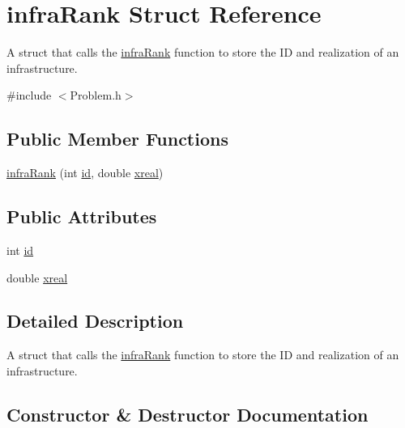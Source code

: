 \hypertarget{structinfraRank}{}\section{infra\+Rank Struct Reference}
\label{structinfraRank}


A struct that calls the \mbox{\hyperlink{structinfraRank}{infra\+Rank}} function to store the ID and realization of an infrastructure.  




{\ttfamily \#include $<$Problem.\+h$>$}

\subsection*{Public Member Functions}
\begin{DoxyCompactItemize}
\item 
\mbox{\hyperlink{structinfraRank_aa50dcfdcee689bd1484c9ac2b09bc694}{infra\+Rank}} (int \mbox{\hyperlink{structinfraRank_ace3640f7fdc691b68111cf07e0eabaae}{id}}, double \mbox{\hyperlink{structinfraRank_a1bb966369809456d65bd4e2d4e19d775}{xreal}})
\end{DoxyCompactItemize}
\subsection*{Public Attributes}
\begin{DoxyCompactItemize}
\item 
int \mbox{\hyperlink{structinfraRank_ace3640f7fdc691b68111cf07e0eabaae}{id}}
\item 
double \mbox{\hyperlink{structinfraRank_a1bb966369809456d65bd4e2d4e19d775}{xreal}}
\end{DoxyCompactItemize}


\subsection{Detailed Description}
A struct that calls the \mbox{\hyperlink{structinfraRank}{infra\+Rank}} function to store the ID and realization of an infrastructure. 

\subsection{Constructor \& Destructor Documentation}
\mbox{\label{structinfraRank_aa50dcfdcee689bd1484c9ac2b09bc694}} 
